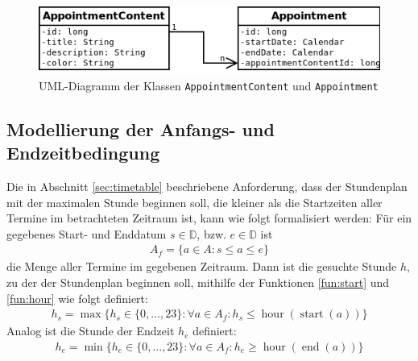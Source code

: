 \documentclass[noindent]{tudreport}
\DeclareMathOperator{\start}{start}
\DeclareMathOperator{\getEnd}{end}
\DeclareMathOperator{\hour}{hour}
\begin{document}
			\begin{figure}[h]
				\centering
				\includegraphics[scale=0.5]{img/uml_appointment.png}
				\caption{UML-Diagramm der Klassen \lstinline!AppointmentContent! und \lstinline!Appointment!}
				\label{fig:uml_appointment}
			\end{figure}
			
			\subsection{Modellierung der Anfangs- und Endzeitbedingung}
				Die in Abschnitt \ref{sec:timetable} beschriebene Anforderung, dass der Stundenplan mit der maximalen Stunde beginnen soll, die kleiner als die Startzeiten aller Termine im betrachteten Zeitraum ist, kann wie folgt formalisiert werden: Für ein gegebenes Start- und Enddatum $s \in \mathbb{D}$, bzw. $e \in \mathbb{D}$ ist
				\begin{align}
A_f = \{a \in A: s \leq a \leq e\}
				\end{align}
				die Menge aller Termine im gegebenen Zeitraum. Dann ist die gesuchte Stunde $h$, zu der der Stundenplan beginnen soll, mithilfe der Funktionen \ref{fun:start} und \ref{fun:hour} wie folgt definiert:
				\begin{align}
h_s = \max\{h_s \in \{0, \dots, 23\}: \forall a \in A_f: h_s \leq \hour(\start(a)) \}
				\end{align}
				Analog ist die Stunde der Endzeit $h_e$ definiert:
				\begin{align}
h_e = \min\{h_e \in \{0, \dots, 23\}: \forall a \in A_f: h_e \geq \hour(\getEnd(a)) \}
				\end{align}
\end{document}
